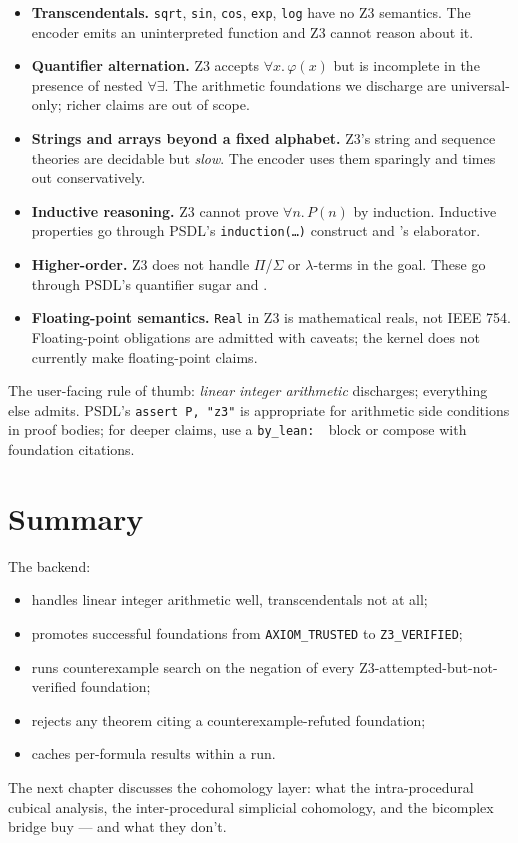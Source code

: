 \begin{itemize}[leftmargin=1.7em]
  \item \textbf{Transcendentals.}  \texttt{sqrt}, \texttt{sin},
    \texttt{cos}, \texttt{exp}, \texttt{log} have no Z3 semantics.
    The encoder emits an uninterpreted function and Z3 cannot
    reason about it.

  \item \textbf{Quantifier alternation.}  Z3 accepts $\forall x.\,
    \varphi(x)$ but is incomplete in the presence of nested
    $\forall \exists$.  The arithmetic foundations we discharge are
    universal-only; richer claims are out of scope.

  \item \textbf{Strings and arrays beyond a fixed alphabet.}  Z3's
    string and sequence theories are decidable but \emph{slow}.
    The encoder uses them sparingly and times out conservatively.

  \item \textbf{Inductive reasoning.}  Z3 cannot prove
    $\forall n.\, P(n)$ by induction.  Inductive properties go
    through PSDL's \texttt{induction(\dots)} construct and
    \Lean{}'s elaborator.

  \item \textbf{Higher-order.}  Z3 does not handle $\Pi$/$\Sigma$
    or $\lambda$-terms in the goal.  These go through PSDL's
    quantifier sugar and \Lean.

  \item \textbf{Floating-point semantics.}  \texttt{Real} in Z3 is
    mathematical reals, not IEEE 754.  Floating-point obligations
    are admitted with caveats; the kernel does not currently make
    floating-point claims.
\end{itemize}

The user-facing rule of thumb: \emph{linear integer arithmetic}
discharges; everything else admits.  PSDL's \verb|assert P, "z3"| is
appropriate for arithmetic side conditions in proof bodies; for
deeper claims, use a \verb|by_lean: |\ block or compose with
foundation citations.

\section{Summary}

The \Zthree{} backend:
\begin{itemize}[leftmargin=1.7em]
  \item handles linear integer arithmetic well, transcendentals
    not at all;
  \item promotes successful foundations from
    \texttt{AXIOM\_TRUSTED} to \texttt{Z3\_VERIFIED};
  \item runs counterexample search on the negation of every
    Z3-attempted-but-not-verified foundation;
  \item rejects any theorem citing a counterexample-refuted
    foundation;
  \item caches per-formula results within a run.
\end{itemize}

The next chapter discusses the cohomology layer: what the
intra-procedural cubical analysis, the inter-procedural simplicial
cohomology, and the bicomplex bridge buy --- and what they don't.

